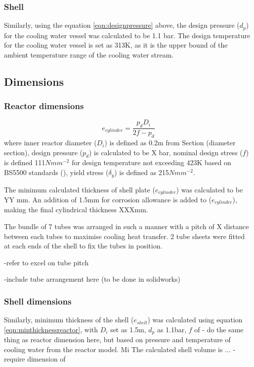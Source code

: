 \subsubsection{Shell}
Similarly, using the equation \ref{eqn:designpressure} above, the design pressure ($d_p$) for the cooling water vessel was calculated to be 1.1 bar. The design temperature for the cooling water vessel is set as 313K, as it is the upper bound of the ambient temperature range of the cooling water stream. 

\subsection{Dimensions}
\label{sec:reactordimensions}

\subsubsection{Reactor dimensions}
\begin{equation}
    e_{cylinder} = \frac{p_dD_i}{2f-p_d}
    \label{eqn:minthicknessreactor}
\end{equation}
where inner reactor diameter ($D_i$) is defined as 0.2m from Section (diameter section), design pressure ($p_d$) is calculated to be X bar, nominal design stress ($f$) is defined 111$Nmm^{-2}$ for design temperature not exceeding 423K based on BS5500 standards (), yield stress ($\delta_y$) is defined as 215$Nmm^{-2}$. 

The minimum calculated thickness of shell plate ($e_{cylinder}$) was calculated to be YY mm. An addition of 1.5mm for corrosion allowance is added to ($e_{cylinder}$), making the final cylindrical thickness XXXmm.

The bundle of 7 tubes was arranged in such a manner with a pitch of X distance between each tubes to maximise cooling heat transfer. 2 tube sheets were fitted at each ends of the shell to fix the tubes in position. 

-refer to excel on tube pitch

-include tube arrangement here (to be done in solidworks)
\subsubsection{Shell dimensions}
Similarly, minimum thickness of the shell ($e_{shell}$) was calculated using equation \ref{eqn:minthicknessreactor}, with $D_i$ set as 1.5m, $d_p$ as 1.1bar, $f$ of 
- do the same thing as reactor dimension here, but based on pressure and temperature of cooling water from the reactor model. Mi
The calculated shell volume is ...
- require dimension of 
